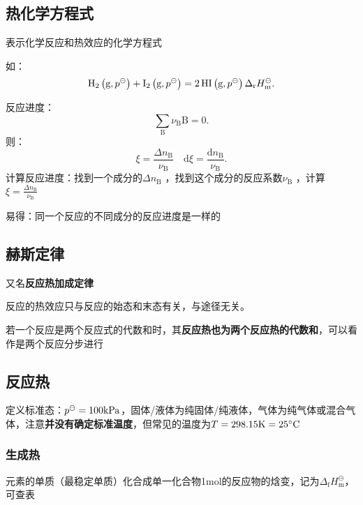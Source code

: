 \subsection{热化学方程式}%
\label{sub:热化学方程式}
\begin{defi}
    表示化学反应和热效应的化学方程式
\end{defi}
如：\[
    \ce{H_2}\left( \text{g},p^\ominus \right) + \ce{I_2}\left( \text{g},p^\ominus \right) = \ce{2HI}\left( \text{g},p^\ominus \right) \Delta_\text{r}H_{\text{m}}^\ominus
.\]
\begin{notation}
    反应进度：\[
        \sum_{\text{B}} \nu_\text{B}\text{B} = 0
    .\]
    则：\[
        \xi = \frac{\Delta n_\text{B}}{\nu_\text{B}} \quad \mathrm{d}\xi = \frac{\mathrm{d}n_\text{B}}{\nu_\text{B}}
    .\]
    计算反应进度：找到一个成分的$\Delta n_\text{B}$ ，找到这个成分的反应系数$\nu_\text{B}$ ，计算$\xi = \frac{\Delta n_\text{B}}{\nu_\text{B}}$
\end{notation}
易得：同一个反应的不同成分的反应进度是一样的
\subsection{赫斯定律}%
\label{sub:赫斯定律}
又名\textbf{反应热加成定律} 
\begin{defi}
    反应的热效应只与反应的始态和末态有关，与途径无关。
\end{defi}
若一个反应是两个反应式的代数和时，其\textbf{反应热也为两个反应热的代数和}，可以看作是两个反应分步进行
\subsection{反应热}%
\label{sub:反应热}
定义标准态：$p^\ominus=100\ce{kPa}$，固体/液体为纯固体/纯液体，气体为纯气体或混合气体，注意\textbf{并没有确定标准温度}，但常见的温度为$T=298.15\ce{K}=25^\circ\text{C}$
\subsubsection*{生成热}%
\label{subsub*:生成热}
元素的单质（最稳定单质）化合成单一化合物1mol的反应物的焓变，记为$\Delta_\text{f}H_{\text{m}}^\ominus $，可查表
